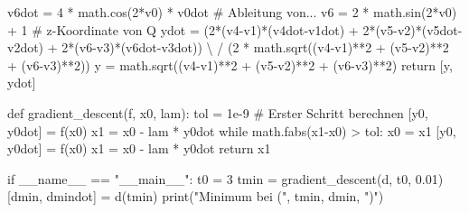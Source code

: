 \documentclass[
  a4paper,
  DIV=11]{scrreprt}
\newenvironment{Shaded}{\begin{snugshade}}{\end{snugshade}}
\newcommand{\BuiltInTok}[1]{\textcolor[rgb]{0.00,0.23,0.31}{#1}}
\newcommand{\CommentTok}[1]{\textcolor[rgb]{0.37,0.37,0.37}{#1}}
\newcommand{\ControlFlowTok}[1]{\textcolor[rgb]{0.00,0.23,0.31}{#1}}
\newcommand{\DecValTok}[1]{\textcolor[rgb]{0.68,0.00,0.00}{#1}}
\newcommand{\FloatTok}[1]{\textcolor[rgb]{0.68,0.00,0.00}{#1}}
\newcommand{\KeywordTok}[1]{\textcolor[rgb]{0.00,0.23,0.31}{#1}}
\newcommand{\NormalTok}[1]{\textcolor[rgb]{0.00,0.23,0.31}{#1}}
\newcommand{\OperatorTok}[1]{\textcolor[rgb]{0.37,0.37,0.37}{#1}}
\newcommand{\StringTok}[1]{\textcolor[rgb]{0.13,0.47,0.30}{#1}}
\newcommand{\VariableTok}[1]{\textcolor[rgb]{0.07,0.07,0.07}{#1}}
\theoremstyle{definition}
\theoremstyle{definition}
\theoremstyle{remark}
\begin{document}
\begin{tcolorbox}
\begin{Shaded}
\begin{Highlighting}[]
\NormalTok{    v6dot }\OperatorTok{=} \DecValTok{4} \OperatorTok{*}\NormalTok{ math.cos(}\DecValTok{2}\OperatorTok{*}\NormalTok{v0) }\OperatorTok{*}\NormalTok{ v0dot  }\CommentTok{\# Ableitung von...}
\NormalTok{    v6 }\OperatorTok{=} \DecValTok{2} \OperatorTok{*}\NormalTok{ math.sin(}\DecValTok{2}\OperatorTok{*}\NormalTok{v0) }\OperatorTok{+} \DecValTok{1}  \CommentTok{\# z{-}Koordinate von Q}
\NormalTok{    ydot }\OperatorTok{=}\NormalTok{ (}\DecValTok{2}\OperatorTok{*}\NormalTok{(v4}\OperatorTok{{-}}\NormalTok{v1)}\OperatorTok{*}\NormalTok{(v4dot}\OperatorTok{{-}}\NormalTok{v1dot) }\OperatorTok{+} \DecValTok{2}\OperatorTok{*}\NormalTok{(v5}\OperatorTok{{-}}\NormalTok{v2)}\OperatorTok{*}\NormalTok{(v5dot}\OperatorTok{{-}}\NormalTok{v2dot) }\OperatorTok{+} \DecValTok{2}\OperatorTok{*}\NormalTok{(v6}\OperatorTok{{-}}\NormalTok{v3)}\OperatorTok{*}\NormalTok{(v6dot}\OperatorTok{{-}}\NormalTok{v3dot)) }\OperatorTok{\textbackslash{}}
         \OperatorTok{/}\NormalTok{ (}\DecValTok{2} \OperatorTok{*}\NormalTok{ math.sqrt((v4}\OperatorTok{{-}}\NormalTok{v1)}\OperatorTok{**}\DecValTok{2} \OperatorTok{+}\NormalTok{ (v5}\OperatorTok{{-}}\NormalTok{v2)}\OperatorTok{**}\DecValTok{2} \OperatorTok{+}\NormalTok{ (v6}\OperatorTok{{-}}\NormalTok{v3)}\OperatorTok{**}\DecValTok{2}\NormalTok{))}
\NormalTok{    y }\OperatorTok{=}\NormalTok{ math.sqrt((v4}\OperatorTok{{-}}\NormalTok{v1)}\OperatorTok{**}\DecValTok{2} \OperatorTok{+}\NormalTok{ (v5}\OperatorTok{{-}}\NormalTok{v2)}\OperatorTok{**}\DecValTok{2} \OperatorTok{+}\NormalTok{ (v6}\OperatorTok{{-}}\NormalTok{v3)}\OperatorTok{**}\DecValTok{2}\NormalTok{)}
    \ControlFlowTok{return}\NormalTok{ [y, ydot]}

\KeywordTok{def}\NormalTok{ gradient\_descent(f, x0, lam):}
\NormalTok{    tol }\OperatorTok{=} \FloatTok{1e{-}9}
    \CommentTok{\# Erster Schritt berechnen}
\NormalTok{    [y0, y0dot] }\OperatorTok{=}\NormalTok{ f(x0)}
\NormalTok{    x1 }\OperatorTok{=}\NormalTok{ x0 }\OperatorTok{{-}}\NormalTok{ lam }\OperatorTok{*}\NormalTok{ y0dot}
    \ControlFlowTok{while}\NormalTok{ math.fabs(x1}\OperatorTok{{-}}\NormalTok{x0) }\OperatorTok{\textgreater{}}\NormalTok{ tol:}
\NormalTok{        x0 }\OperatorTok{=}\NormalTok{ x1}
\NormalTok{        [y0, y0dot] }\OperatorTok{=}\NormalTok{ f(x0)}
\NormalTok{        x1 }\OperatorTok{=}\NormalTok{ x0 }\OperatorTok{{-}}\NormalTok{ lam }\OperatorTok{*}\NormalTok{ y0dot}
    \ControlFlowTok{return}\NormalTok{ x1}

\ControlFlowTok{if} \VariableTok{\_\_name\_\_} \OperatorTok{==} \StringTok{"\_\_main\_\_"}\NormalTok{:}
\NormalTok{    t0 }\OperatorTok{=} \DecValTok{3}
\NormalTok{    tmin }\OperatorTok{=}\NormalTok{ gradient\_descent(d, t0, }\FloatTok{0.01}\NormalTok{)}
\NormalTok{    [dmin, dmindot] }\OperatorTok{=}\NormalTok{ d(tmin)}
    \BuiltInTok{print}\NormalTok{(}\StringTok{"Minimum bei ("}\NormalTok{, tmin, dmin, }\StringTok{")"}\NormalTok{)}


\end{Highlighting}
\end{Shaded}
\end{tcolorbox}
\end{document}
